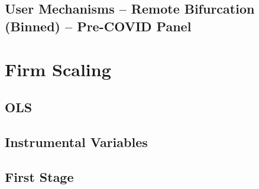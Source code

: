 \documentclass{article}
\newcommand{\cleanedresultsdir}{../../results/cleaned}
\begin{document}
\clearpage
\begin{landscape}
\section{User Mechanisms – Remote Bifurcation (Binned) – Pre-COVID Panel}

\end{landscape}


\clearpage
\section{Firm Scaling}

\subsection{OLS}


\subsection{Instrumental Variables}


\subsection{First Stage}


% 

% 
\end{document}

